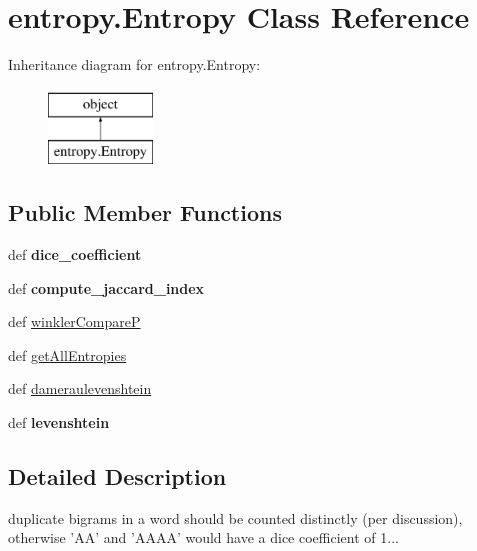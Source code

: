 \hypertarget{classentropy_1_1_entropy}{\section{entropy.\-Entropy Class Reference}
\label{classentropy_1_1_entropy}
}
Inheritance diagram for entropy.\-Entropy\-:\begin{figure}[H]
\begin{center}
\leavevmode
\includegraphics[height=2.000000cm]{classentropy_1_1_entropy}
\end{center}
\end{figure}
\subsection*{Public Member Functions}
\begin{DoxyCompactItemize}
\item 
\hypertarget{classentropy_1_1_entropy_a907635c50b59c160e09192fdb0cd56c5}{def {\bfseries dice\-\_\-coefficient}}\label{classentropy_1_1_entropy_a907635c50b59c160e09192fdb0cd56c5}

\item 
\hypertarget{classentropy_1_1_entropy_acc04c8428c9cd63f5f572783fefcd35f}{def {\bfseries compute\-\_\-jaccard\-\_\-index}}\label{classentropy_1_1_entropy_acc04c8428c9cd63f5f572783fefcd35f}

\item 
def \hyperlink{classentropy_1_1_entropy_a8b8657211f139161dc3851692bf496fd}{winkler\-Compare\-P}
\item 
def \hyperlink{classentropy_1_1_entropy_ab6bfc57e1b5d3b4f3fb93f243c3946cc}{get\-All\-Entropies}
\item 
def \hyperlink{classentropy_1_1_entropy_a607991156d5723944e95de617599f156}{dameraulevenshtein}
\item 
\hypertarget{classentropy_1_1_entropy_a905010113e49e5fcda39754c2d48fab4}{def {\bfseries levenshtein}}\label{classentropy_1_1_entropy_a905010113e49e5fcda39754c2d48fab4}

\end{DoxyCompactItemize}


\subsection{Detailed Description}
\begin{DoxyVerb}duplicate bigrams in a word should be counted distinctly
(per discussion), otherwise 'AA' and 'AAAA' would have a
dice coefficient of 1...
\end{DoxyVerb}
 

